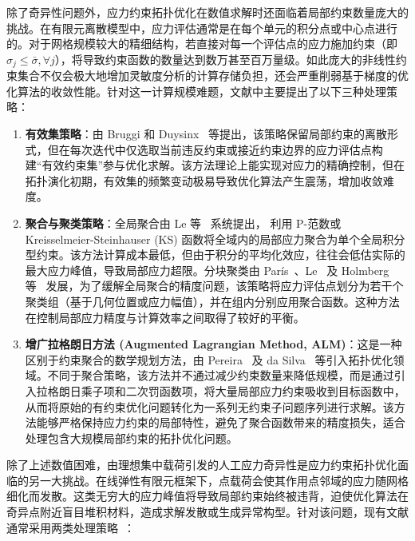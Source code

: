 除了奇异性问题外，应力约束拓扑优化在数值求解时还面临着局部约束数量庞大的挑战。在有限元离散模型中，应力评估通常是在每个单元的积分点或中心点进行的。对于网格规模较大的精细结构，若直接对每一个评估点的应力施加约束（即 $\sigma_{j} \le \bar{\sigma}, \forall j$），将导致约束函数的数量达到数万甚至百万量级。如此庞大的非线性约束集合不仅会极大地增加灵敏度分析的计算存储负担，还会严重削弱基于梯度的优化算法的收敛性能。针对这一计算规模难题，文献中主要提出了以下三种处理策略：

\begin{enumerate}[{（}1{）}]
	\item \textbf{有效集策略}：由 Bruggi 和 Duysinx~\cite{bruggiTopologyOptimizationMinimum2012} 等提出，该策略保留局部约束的离散形式，但在每次迭代中仅选取当前违反约束或接近约束边界的应力评估点构建“有效约束集”参与优化求解。该方法理论上能实现对应力的精确控制，但在拓扑演化初期，有效集的频繁变动极易导致优化算法产生震荡，增加收敛难度。
	
	\item \textbf{聚合与聚类策略}：全局聚合由 Le 等~\cite{leStressbasedTopologyOptimization2010b} 系统提出，
	利用 P-范数或 Kreisselmeier-Steinhauser (KS) 函数将全域内的局部应力聚合为单个全局积分型约束。该方法计算成本最低，但由于积分的平均化效应，往往会低估实际的最大应力峰值，导致局部应力超限。分块聚类由 París~\cite{parisBlockAggregationStress2010}、Le~\cite{leStressbasedTopologyOptimization2010b} 及 Holmberg 等~\cite{holmbergStressConstrainedTopology2013a} 发展，为了缓解全局聚合的精度问题，该策略将应力评估点划分为若干个聚类组（基于几何位置或应力幅值），并在组内分别应用聚合函数。这种方法在控制局部应力精度与计算效率之间取得了较好的平衡。
	
	\item \textbf{增广拉格朗日方法 (Augmented Lagrangian Method, ALM)}：这是一种区别于约束聚合的数学规划方法，由 Pereira~\cite{pereiraTopologyOptimizationContinuum2004} 及 da Silva~\cite{dasilvaTopologyOptimizationContinuum2018} 等引入拓扑优化领域。不同于聚合策略，该方法并不通过减少约束数量来降低规模，而是通过引入拉格朗日乘子项和二次罚函数项，将大量局部应力约束吸收到目标函数中，从而将原始的有约束优化问题转化为一系列无约束子问题序列进行求解。该方法能够严格保持应力约束的局部特性，避免了聚合函数带来的精度损失，适合处理包含大规模局部约束的拓扑优化问题。
\end{enumerate}

除了上述数值困难，由理想集中载荷引发的人工应力奇异性是应力约束拓扑优化面临的另一大挑战。在线弹性有限元框架下，点载荷会使其作用点邻域的应力随网格细化而发散。这类无穷大的应力峰值将导致局部约束始终被违背，迫使优化算法在奇异点附近盲目堆积材料，造成求解发散或生成异常构型。针对该问题，现有文献通常采用两类处理策略~\cite{holmbergStressConstrainedTopology2013a, giraldo-londonoPolyStressMatlabImplementation2021}：


